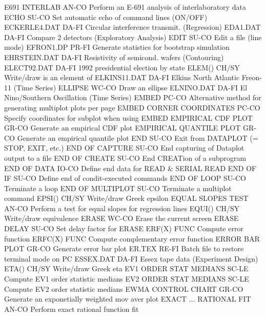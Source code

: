 E691 INTERLAB               AN-CO Perform an E-691 analysis of interlaboratory data
ECHO                        SU-CO Set automatic echo of command lines (ON/OFF)
ECKERLE4.DAT                DA-FI Circular interference transmit. (Regression)
EDA1.DAT                    DA-FI Compare 2 detectors (Exploratory Analysis)
EDIT                        SU-CO Edit a file (line mode)
EFRON1.DP                   PR-FI Generate statistics for bootstrap simulation
EHRSTEIN.DAT                DA-FI Resistivity of semicond. wafers (Contouring)
ELECT92.DAT                 DA-FI 1992 presidential election by state
ELEM()                      CH/SY Write/draw is an element of
ELKINS11.DAT                DA-FI Elkins North Atlantic Freon-11 (Time Series)
ELLIPSE                     WC-CO Draw an ellipse
ELNINO.DAT                  DA-FI El Nino/Southern Oscillation (Time Series)
EMBED                       PC-CO Alternative method for generating multiplot plots per page
EMBED CORNER COORDINATES    PC-CO Specify coordinates for subplot when using EMBED
EMPIRICAL CDF PLOT          GR-CO Generate an empirical CDF plot
EMPIRICAL QUANTILE PLOT     GR-CO Generate an empirical quantile plot
END                         SU-CO Exit from DATAPLOT (= STOP, EXIT, etc.)
END OF CAPTURE              SU-CO End capturing of Dataplot output to a file
END OF CREATE               SU-CO End CREATion of a subprogram
END OF DATA                 IO-CO Define end data for READ & SERIAL READ
END OF IF                   SU-CO Define end of condit-executed commands
END OF LOOP                 SU-CO Terminate a loop
END OF MULTIPLOT            SU-CO Terminate a multiplot command
EPSI()                      CH/SY Write/draw Greek epsilon
EQUAL SLOPES TEST           AN-CO Perform a test for equal slopes for regression lines
EQUI()                      CH/SY Write/draw equivalence
ERASE                       WC-CO Erase the current screen
ERASE DELAY                 SU-CO Set delay factor for ERASE
ERF(X)                      FUNC  Compute error function
ERFC(X)                     FUNC  Compute complementary error function
ERROR BAR PLOT              GR-CO Generate error bar plot
ER.TEX                      RE-FI Batch file to restore terminal mode on PC
ESSEX.DAT                   DA-FI Essex tape data (Experiment Design)
ETA()                       CH/SY Write/draw Greek eta
EV1 ORDER STAT MEDIANS      SC-LE Compute EV1 order statistic medians
EV2 ORDER STAT MEDIANS      SC-LE Compute EV2 order statistic medians
EWMA CONTROL CHART          GR-CO Generate an exponetially weighted mov aver plot
EXACT ... RATIONAL FIT      AN-CO Perform exact rational function fit
